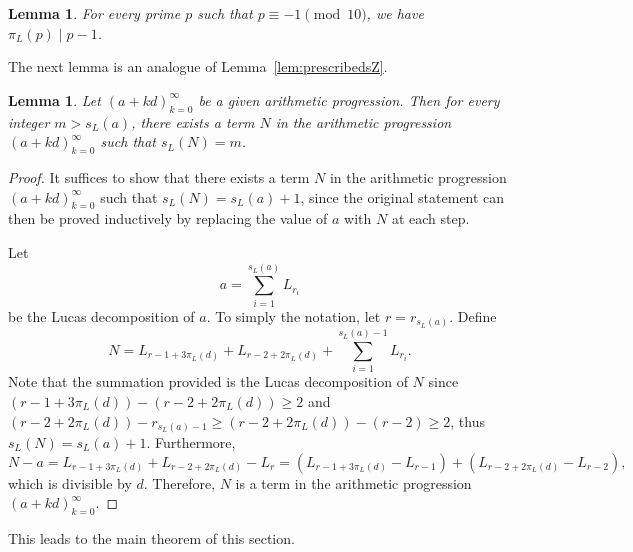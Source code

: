 \documentclass[12pt]{article}
\newtheorem{lemma}[theorem]{Lemma}
\theoremstyle{definition}
\begin{document}
\begin{lemma}\label{lem:piL}
For every prime $p$ such that $p\equiv-1\pmod{10}$, we have $\pi_L(p)\mid p-1$.
\end{lemma}

The next lemma is an analogue of Lemma~\ref{lem:prescribedsZ}.

\begin{lemma}\label{lem:prescribedsL}
Let $(a+kd)_{k=0}^\infty$ be a given arithmetic progression. Then for every integer $m>s_L(a)$, there exists a term $N$ in the arithmetic progression $(a+kd)_{k=0}^\infty$ such that $s_L(N)=m$.
\end{lemma}
\begin{proof}
It suffices to show that there exists a term $N$ in the arithmetic progression $(a+kd)_{k=0}^\infty$ such that $s_L(N)=s_L(a)+1$, since the original statement can then be proved inductively by replacing the value of $a$ with $N$ at each step.

Let
\[a=\sum_{i=1}^{s_L(a)}L_{r_i}\]
be the Lucas decomposition of $a$. To simply the notation, let $r=r_{s_L(a)}$. Define
\[N=L_{r-1+3\pi_L(d)}+L_{r-2+2\pi_L(d)}+\sum_{i=1}^{s_L(a)-1}L_{r_i}.\]
Note that the summation provided is the Lucas decomposition of $N$ since $(r-1+3\pi_L(d))-(r-2+2\pi_L(d))\geq2$ and $(r-2+2\pi_L(d))-r_{s_L(a)-1}\geq(r-2+2\pi_L(d))-(r-2)\geq2$, thus $s_L(N)=s_L(a)+1$. Furthermore,
\[N-a=L_{r-1+3\pi_L(d)}+L_{r-2+2\pi_L(d)}-L_r=(L_{r-1+3\pi_L(d)}-L_{r-1})+(L_{r-2+2\pi_L(d)}-L_{r-2}),\]
which is divisible by $d$. Therefore, $N$ is a term in the arithmetic progression $(a+kd)_{k=0}^\infty$.
\end{proof}

This leads to the main theorem of this section.
\end{document}

